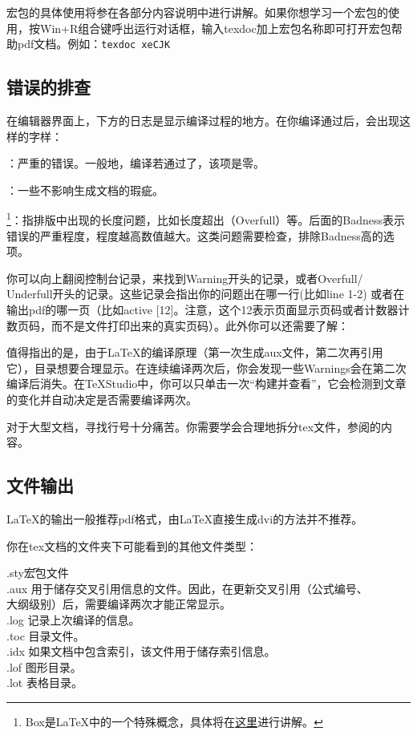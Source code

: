 {宏包的具体使用将参在各部分内容说明中进行讲解。如果你想学习一个宏包的使用，按Win+R组合键呼出运行对话框，输入texdoc加上宏包名称即可打开宏包帮助pdf文档。例如：\verb|texdoc xeCJK|

\subsection{错误的排查}
\label{subsec:debug}
在编辑器界面上，下方的日志是显示编译过程的地方。在你编译通过后，会出现这样的字样：
\begin{feai}
	\item {}：严重的错误。一般地，编译若通过了，该项是零。
	\item {}：一些不影响生成文档的瑕疵。
	\item {\footnote{Box是\LaTeX{}中的一个特殊概念，具体将在\hyperref[sec:box]{这里}进行讲解。}}：指排版中出现的长度问题，比如长度超出（Overfull）等。后面的Badness表示错误的严重程度，程度越高数值越大。这类问题需要检查，排除Badness高的选项。
\end{feai}

你可以向上翻阅控制台记录，来找到Warning开头的记录，或者Overfull/ Underfull开头的记录。这些记录会指出你的问题出在哪一行(比如line 1-2) 或者在输出pdf的哪一页（比如active [12]。注意，这个12表示页面显示页码或者计数器计数页码，而不是文件打印出来的真实页码）。此外你可以还需要了解：
\begin{feai}
	\item 值得指出的是，由于\LaTeX{}的编译原理（第一次生成aux文件，第二次再引用它），目录想要合理显示。在连续编译两次后，你会发现一些Warnings会在第二次编译后消失。在\TeX Studio中，你可以只单击一次“构建并查看”，它会检测到文章的变化并自动决定是否需要编译两次。
	\item 对于大型文档，寻找行号十分痛苦。你需要学会合理地拆分tex文件，参阅的内容。
\end{feai}
\subsection{文件输出}
\LaTeX{}的输出一般推荐pdf格式，由\LaTeX 直接生成dvi的方法并不推荐。

你在tex文档的文件夹下可能看到的其他文件类型：
\begin{tabbing}
	.sty{\hspace{2em}}\=宏包文件\\
	.aux    \> 用于储存交叉引用信息的文件。因此，在更新交叉引用（公式编号、\\
	\> 大纲级别）后，需要编译两次才能正常显示。\\
	.log    \> 记录上次编译的信息。\\
	.toc    \> 目录文件。\\
	.idx    \> 如果文档中包含索引，该文件用于储存索引信息。\\
	.lof    \> 图形目录。\\
	.lot    \> 表格目录。
\end{tabbing}

}
